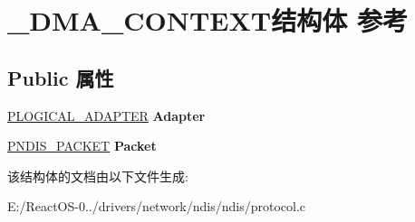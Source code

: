 \hypertarget{struct___d_m_a___c_o_n_t_e_x_t}{}\section{\+\_\+\+D\+M\+A\+\_\+\+C\+O\+N\+T\+E\+X\+T结构体 参考}
\label{struct___d_m_a___c_o_n_t_e_x_t}
\subsection*{Public 属性}
\begin{DoxyCompactItemize}
\item 
\mbox{\label{struct___d_m_a___c_o_n_t_e_x_t_ab00cc47357d00092ef8a3c5e63459773}} 
\hyperlink{struct___l_o_g_i_c_a_l___a_d_a_p_t_e_r}{P\+L\+O\+G\+I\+C\+A\+L\+\_\+\+A\+D\+A\+P\+T\+ER} {\bfseries Adapter}
\item 
\mbox{\label{struct___d_m_a___c_o_n_t_e_x_t_afee216497cf7db02b706a21c06652628}} 
\hyperlink{struct___n_d_i_s___p_a_c_k_e_t}{P\+N\+D\+I\+S\+\_\+\+P\+A\+C\+K\+ET} {\bfseries Packet}
\end{DoxyCompactItemize}


该结构体的文档由以下文件生成\+:\begin{DoxyCompactItemize}
\item 
E\+:/\+React\+O\+S-\/0../drivers/network/ndis/ndis/protocol.\+c\end{DoxyCompactItemize}
